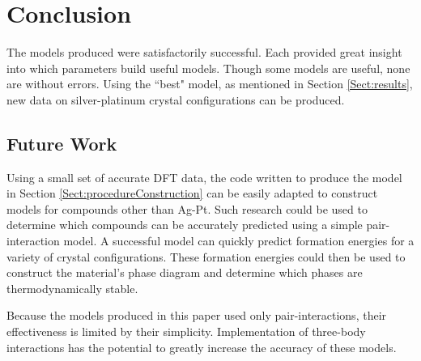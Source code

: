 \chapter{Conclusion}\label{Sect:conclusion}
\par The models produced were satisfactorily successful. Each provided great insight into which parameters build useful models. Though some models are useful, none are without errors. Using the ``best" model, as mentioned in Section \ref{Sect:results}, new data on silver-platinum crystal configurations can be produced.


\section{Future Work}\label{Sect:futureWork}
\par Using a small set of accurate DFT data, the code written to produce the model in Section \ref{Sect:procedureConstruction} can be easily adapted to construct models for compounds other than Ag-Pt. Such research could be used to determine which compounds can be accurately predicted using a simple pair-interaction model. A successful model can quickly predict formation energies for a variety of crystal configurations. These formation energies could then be used to construct the material’s phase diagram and determine which phases are thermodynamically stable.
\par Because the models produced in this paper used only pair-interactions, their effectiveness is limited by their simplicity. Implementation of three-body interactions has the potential to greatly increase the accuracy of these models.
